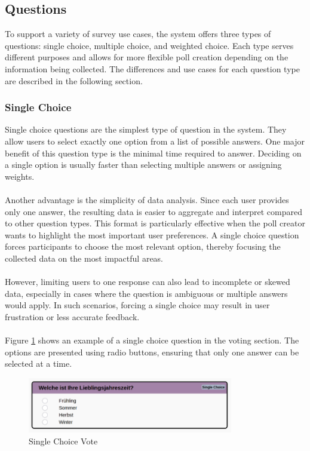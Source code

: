 \documentclass[a4paper,12pt]{report}
\begin{document}
\subsection{Questions}
To support a variety of survey use cases, the system offers three types of questions: single choice, multiple choice, and weighted choice. Each type serves different purposes and allows for more flexible poll creation depending on the information being collected. The differences and use cases for each question type are described in the following section.
\subsubsection{Single Choice}
Single choice questions are the simplest type of question in the system. They allow users to select exactly one option from a list of possible answers. One major benefit of this question type is the minimal time required to answer. Deciding on a single option is usually faster than selecting multiple answers or assigning weights. \\ \\
Another advantage is the simplicity of data analysis. Since each user provides only one answer, the resulting data is easier to aggregate and interpret compared to other question types. This format is particularly effective when the poll creator wants to highlight the most important user preferences. A single choice question forces participants to choose the most relevant option, thereby focusing the collected data on the most impactful areas. \\ \\
However, limiting users to one response can also lead to incomplete or skewed data, especially in cases where the question is ambiguous or multiple answers would apply. In such scenarios, forcing a single choice may result in user frustration or less accurate feedback. \cite{singlevsmultiple} \\ \\
Figure \ref{fig:singlechoice} shows an example of a single choice question in the voting section. The options are presented using radio buttons, ensuring that only one answer can be selected at a time.
\begin{figure}[H]	
	\centering	
	\includegraphics[width=0.8\textwidth]{pics/Single_Choice.png}	
	\caption{Single Choice Vote}	
	\label{fig:singlechoice}
\end{figure}
\end{document}
